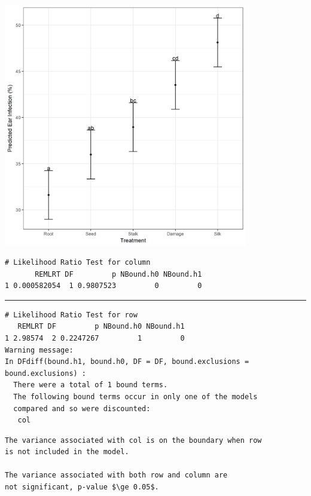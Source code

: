 \documentclass[a4paper, 10pt, fleqn, twosided]{memoir}
\begin{document}
\begin{tcolorbox}[title = Exercise 11 output continued]
\includegraphics[width=0.8\textwidth, frame]{Exercise11Pred.png}
\end{tcolorbox}

\begin{tcolorbox}[title = Exercise 11 output continued]
\begin{verbatim}
# Likelihood Ratio Test for column
       REMLRT DF         p NBound.h0 NBound.h1
1 0.000582054  1 0.9807523         0         0
\end{verbatim}
{\color{outpt} {\hrule height 1pt}}
\begin{verbatim}
# Likelihood Ratio Test for row
   REMLRT DF         p NBound.h0 NBound.h1
1 2.98574  2 0.2247267         1         0
Warning message:
In DFdiff(bound.h1, bound.h0, DF = DF, bound.exclusions = bound.exclusions) :
  There were a total of 1 bound terms.
  The following bound terms occur in only one of the models
  compared and so were discounted:
   col
\end{verbatim}
\end{tcolorbox}

\begin{tcolorbox}[title = Exercise 11 interpretation]
\begin{verbatim}
The variance associated with col is on the boundary when row
is not included in the model.

The variance associated with both row and column are
not significant, p-value $\ge 0.05$.
\end{verbatim}
\end{tcolorbox}
\end{document}
